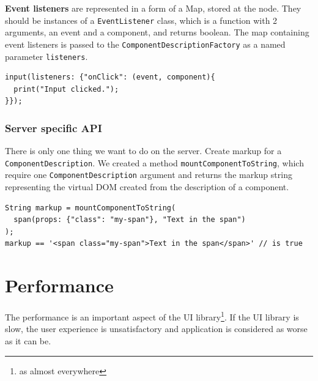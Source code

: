 \documentclass[oneside, 12pt]{book}
\begin{document}


    \textbf{Event listeners} are represented in a form of a Map, stored at the node. 
    They should be instances of a \texttt{EventListener} class, which is a function with 2 arguments, an event and a component, and returns boolean.
    The map containing event listeners is passed to the \texttt{ComponentDescriptionFactory} as a named parameter \texttt{listeners}.

\begin{verbatim}
input(listeners: {"onClick": (event, component){
  print("Input clicked.");
}});
\end{verbatim}



  \subsection{Server specific API}\label{subsec:our-api-server}

    There is only one thing we want to do on the server. Create markup for a \texttt{ComponentDescription}.
    We created a method \texttt{mountComponentToString}, 
    which require one \texttt{ComponentDescription} argument and returns the markup string representing the virtual DOM created from the description of a component.
\begin{verbatim}
String markup = mountComponentToString(
  span(props: {"class": "my-span"}, "Text in the span")
);
markup == '<span class="my-span">Text in the span</span>' // is true
\end{verbatim}




\chapter{Performance}\label{chap:performance}

  The performance is an important aspect of the UI library\footnote{as almost everywhere}.
  If the UI library is slow, the user experience is unsatisfactory and application is considered as worse as it can be.
\end{document}
